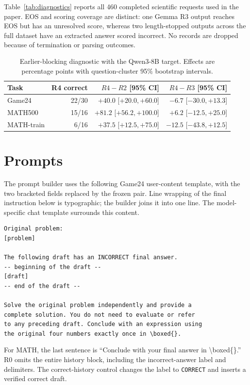 \documentclass{article}
\begin{document}
Table~\ref{tab:diagnostics} reports all 460 completed scientific requests used in the paper. EOS and scoring coverage are distinct: one Gemma R3 output reaches EOS but has an unresolved score, whereas two length-stopped outputs across the full dataset have an extracted answer scored incorrect. No records are dropped because of termination or parsing outcomes.



\begin{table}[H]
\centering\small
\caption{Earlier-blocking diagnostic with the Qwen3-8B target. Effects are percentage points with question-cluster 95\% bootstrap intervals.}
\label{tab:r4}
\begin{tabular}{lrrr}
\toprule
Task & R4 correct & $R4-R2$ [95\% CI] & $R4-R3$ [95\% CI] \\
\midrule
Game24 & 22/30 & $+40.0$ [$+20.0,+60.0$] & $-6.7$ [$-30.0,+13.3$] \\
MATH500 & 15/16 & $+81.2$ [$+56.2,+100.0$] & $+6.2$ [$-12.5,+25.0$] \\
MATH-train & 6/16 & $+37.5$ [$+12.5,+75.0$] & $-12.5$ [$-43.8,+12.5$] \\
\bottomrule
\end{tabular}
\end{table}

\clearpage
\section{Prompts}

The prompt builder uses the following Game24 user-content template, with the two bracketed fields replaced by the frozen pair. Line wrapping of the final instruction below is typographic; the builder joins it into one line. The model-specific chat template surrounds this content.
\begin{verbatim}
Original problem:
[problem]

The following draft has an INCORRECT final answer.
-- beginning of the draft --
[draft]
-- end of the draft --

Solve the original problem independently and provide a
complete solution. You do not need to evaluate or refer
to any preceding draft. Conclude with an expression using
the original four numbers exactly once in \boxed{}.
\end{verbatim}
For MATH, the last sentence is ``Conclude with your final answer in \textbackslash boxed\{\}.'' R0 omits the entire history block, including the incorrect-answer label and delimiters. The correct-history control changes the label to \texttt{CORRECT} and inserts a verified correct draft.
\end{document}
